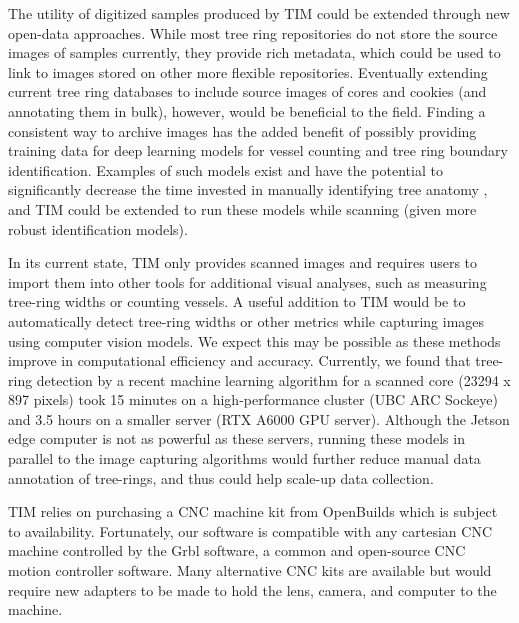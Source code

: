 \documentclass[a4paper,12pt]{article}
\begin{document}
The utility of digitized samples produced by TIM could be extended through new open-data approaches. 
While most tree ring repositories \citep[e.g.,the International Tree-Ring Data Bank or TreeSource's Tree-Rings Database for Canadian sites][]{grissino-mayer_international_1997,girardin_national_2021} do not store the source images of samples currently, they provide rich metadata, which could be used to link to images stored on other more flexible repositories. 
Eventually extending current tree ring databases to include source images of cores and cookies (and annotating them in bulk), however, would be beneficial to the field. Finding a consistent way to archive images has the added benefit of possibly providing training data for deep learning models for vessel counting and tree ring boundary identification. 
Examples of such models exist and have the potential to significantly decrease the time invested in manually identifying tree anatomy \citep{resente_mask_2021,polacek_automation_2023}, and TIM could be extended to run these models while scanning (given more robust identification models).


In its current state, TIM only provides scanned images and requires users to import them into other tools for additional visual analyses, such as measuring tree-ring widths or counting vessels.
A useful addition to TIM would be to automatically detect tree-ring widths or other metrics while capturing images using computer vision models. We expect this may be possible as these methods improve in computational efficiency and accuracy. Currently, we found that tree-ring detection by a recent machine learning algorithm  \citep[R-CNN presented by][]{polacek_automation_2023} for a scanned core (23294 x 897 pixels) took 15 minutes on a high-performance cluster (UBC ARC Sockeye) and 3.5 hours on a smaller server (RTX A6000 GPU server). 
Although the Jetson edge computer is not as powerful as these servers, running these models in parallel to the image capturing algorithms would further reduce manual data annotation of tree-rings, and thus could help scale-up data collection.

TIM relies on purchasing a CNC machine kit from OpenBuilds which is subject to availability. Fortunately, our software is compatible with any cartesian CNC machine controlled by the Grbl software, a common and open-source CNC motion controller software.
Many alternative CNC kits are available but would require new adapters to be made to hold the lens, camera, and computer to the machine.
\end{document}
